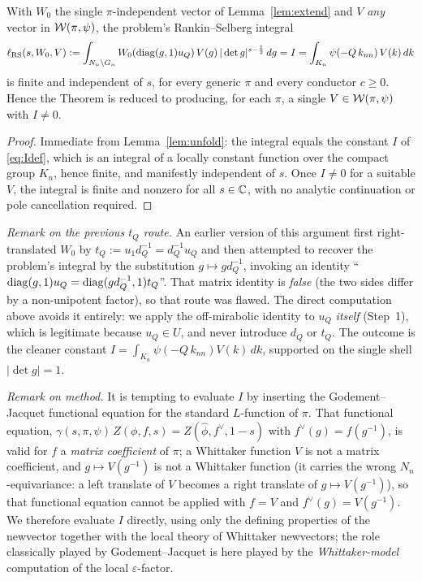 \begin{qtwocorollary}\label{cor:sindep}
With $W_0$ the single $\pi$-independent vector of Lemma~\ref{lem:extend} and $V$ \emph{any}
vector in $\mathcal{W}(\pi,\psi)$, the problem's Rankin--Selberg integral
\[
\ell_{\mathrm{RS}}(s,W_0,V):=\int_{N_n\backslash G_n}W_0(\operatorname{diag}(g,1)u_Q)\,V(g)\,|\det g|^{s-\frac12}\,dg
=I=\int_{K_n}\psi(-Q\,k_{nn})\,V(k)\,dk
\]
is finite and independent of $s$, for every generic $\pi$ and every conductor $c\ge0$. Hence the
Theorem is reduced to producing, for each $\pi$, a single $V\in\mathcal{W}(\pi,\psi)$ with $I\neq0$.
\end{qtwocorollary}

\begin{proof}
Immediate from Lemma~\ref{lem:unfold}: the integral equals the constant $I$ of \eqref{eq:Idef},
which is an integral of a locally constant function over the compact group $K_n$, hence finite,
and manifestly independent of $s$. Once $I\neq0$ for a suitable $V$, the integral is finite and
nonzero for all $s\in\mathbb{C}$, with no analytic continuation or pole cancellation required.
\end{proof}

\medskip
\noindent\emph{Remark on the previous $t_Q$ route.} An earlier version of this argument first
right-translated $W_0$ by $t_Q:=u_1d_Q^{-1}=d_Q^{-1}u_Q$ and then attempted to recover the
problem's integral by the substitution $g\mapsto gd_Q^{-1}$, invoking an identity
``$\operatorname{diag}(g,1)u_Q=\operatorname{diag}(gd_Q^{-1},1)t_Q$''. That matrix identity is \emph{false}
\textup{(}the two sides differ by a non-unipotent factor\textup{)}, so that route was flawed. The
direct computation above avoids it entirely: we apply the off-mirabolic identity to $u_Q$
\emph{itself} \textup{(}Step~1\textup{)}, which is legitimate because $u_Q\in U$, and never
introduce $d_Q$ or $t_Q$. The outcome is the cleaner constant
$I=\int_{K_n}\psi(-Q\,k_{nn})V(k)\,dk$, supported on the single shell $|\det g|=1$.

\medskip
\noindent\emph{Remark on method.} It is tempting to evaluate $I$ by inserting the
Godement--Jacquet functional equation for the standard $L$-function of $\pi$. That functional
equation, $\gamma(s,\pi,\psi)\,Z(\phi,f,s)=Z(\widehat\phi,f^\vee,1-s)$ with
$f^\vee(g)=f(g^{-1})$, is valid for $f$ a \emph{matrix coefficient} of $\pi$; a Whittaker
function $V$ is not a matrix coefficient, and $g\mapsto V(g^{-1})$ is not a Whittaker function
\textup{(}it carries the wrong $N_n$-equivariance: a left translate of $V$ becomes a right
translate of $g\mapsto V(g^{-1})$\textup{)}, so that functional equation cannot be applied with
$f=V$ and $f^\vee(g)=V(g^{-1})$. We therefore evaluate $I$ directly, using only the defining
properties of the newvector together with the local theory of Whittaker newvectors; the role
classically played by Godement--Jacquet is here played by the \emph{Whittaker-model} computation
of the local $\varepsilon$-factor.

